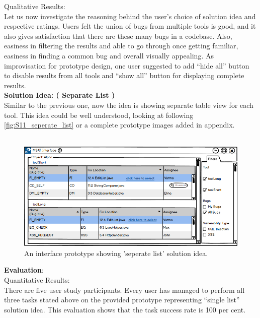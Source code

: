 Qualitative Results: \\

Let us now investigate the reasoning behind the user’s choice of solution idea and respective ratings. Users felt the union of bugs from multiple tools is good, and it also gives satisfaction that there are these many bugs in a codebase. Also, easiness in filtering the results and able to go through once getting familiar, easiness in finding a common bug and overall visually appealing. As improvisation for prototype design, one user suggested to add “hide all” button to disable results from all tools and “show all” button for displaying complete results. \\


\textbf{Solution Idea: ( Separate List )} \\

Similar to the previous one, now the idea is showing separate table view for each tool. This idea could be well understood, looking at following \autoref{fig:S11_seperate_list} or a complete prototype images added in appendix. \\ \\


\begin{figure}[hbt!]
	\centering
	\includegraphics[width=\linewidth]{figures/solution_ideas_snaps/S11_seperate_list}
	\caption{An interface prototype showing 'seperate list' solution idea.}
	\label{fig:S11_seperate_list}
\end{figure}


\textbf{Evaluation}: \\

Quantitative Results: \\

There are five user study participants. Every user has managed to perform all three tasks stated above on the provided prototype representing “single list” solution idea. This evaluation shows that the task success rate is 100 per cent. \\

